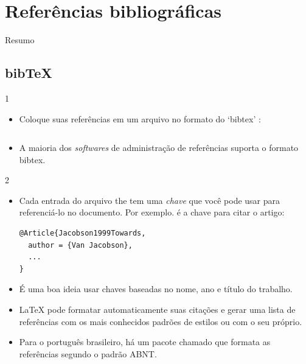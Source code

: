 \documentclass{beamer}
\begin{document}
\section{Referências bibliográficas}

\begin{frame}{Resumo}
\begin{multicols}{2}
\tableofcontents[currentsection]
\end{multicols}
\end{frame}

\subsection{bib\TeX}
\begin{frame}[fragile]{\insertsubsection{} 1}
\begin{itemize}
\item Coloque suas referências em um arquivo   no formato do  `bibtex' :
\inputminted[fontsize=\scriptsize,frame=single]{latex}{bib-example.bib}
\item A maioria dos \emph{softwares} de administração de referências suporta o formato
bibtex.
\end{itemize}
\end{frame}

\begin{frame}[fragile]{\insertsubsection{} 2}
\begin{itemize}
\item Cada entrada do arquivo the  tem uma \emph{chave} que você pode
usar para referenciá-lo no documento. Por exemplo.   é
a chave para citar o artigo:
\begin{verbatim}
@Article{Jacobson1999Towards,
  author = {Van Jacobson},
  ...
}
\end{verbatim}
\item É uma boa ideia usar chaves baseadas no nome, ano e título do trabalho.
\item \LaTeX{} pode formatar automaticamente suas citações e gerar uma lista de
referências com os mais conhecidos padrões de estilos ou com o seu próprio.
\item Para o português brasileiro, há um pacote chamado 
\href{https://code.google.com/p/abntex2/}{} que
formata as referências segundo o padrão ABNT. 
\end{itemize}
\end{frame}
\end{document}
